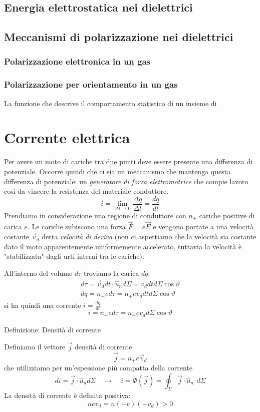 \documentclass[x11names]{report}
\newcommand{\definizione}[2]{
	\begin{center}
		\fboxsep11pt
		\colorbox{myblue}{\begin{minipage}{5.75in}
				\begin{blues}{Definizione: #1}
					#2
				\end{blues}
		\end{minipage}}
	\end{center}
}
\begin{document}
\subsection{Energia elettrostatica nei dielettrici}

\subsection{Meccanismi di polarizzazione nei dielettrici}
\subsubsection{Polarizzazione elettronica in un gas}
\subsubsection{Polarizzazione per orientamento in un gas}
La funzione che descrive il comportamento statistico di un insieme di 

\newpage


\section{Corrente elettrica}
Per avere un moto di cariche tra due punti deve essere presente una differenza di potenziale. Occorre quindi che ci sia un meccanismo che mantenga questa differenza di potenziale: un \textit{generatore di forza elettromotrice} che compie lavoro così da vincere la resistenza del materiale conduttore.
\[
i =  \lim_{\Delta t \to 0} \frac{\Delta q}{\Delta t} = \frac{dq}{dt}
\]
Prendiamo in considerazione una regione di conduttore con \(n_+\) cariche positive di carica \(e\). Le cariche subiscono una forza \(\vec{F} = e\vec{E}\) e vengono portate a una velocità costante \(\vec{v}_d\) detta \textit{velocità di deriva} (non ci aspettiamo che la velocità sia costante dato il moto apparentemente uniformemente accelerato, tuttavia la velocità è "stabilizzata" dagli urti interni tra le cariche).

All'interno del volume \(d\tau\) troviamo la carica \(dq\):
\begin{gather*}
	d\tau = \vec{v}_d dt \cdot \hat{u}_n d\Sigma = v_d dt d\Sigma \cos\vartheta \\
	dq = n_+ e d\tau = n_+ e v_d dt d\Sigma \cos\vartheta
\end{gather*}
si ha quindi una corrente \(i = \frac{dq}{dt}\) 
\[
i =  n_+ e d\tau = n_+ e v_d  d\Sigma \cos\vartheta
\]

\definizione{Densità di corrente}{
Definiamo il vettore \(\vec{j}\) densità di corrente 
\[
\vec{j} = n_+ e \vec{v}_d 
\]
che utilizziamo per un'espessione più compatta della corrente
\[
di = \vec{j}\cdot\hat{u}_n d\Sigma \quad \to \quad i = \Phi(\vec{j}) = \oint_\Sigma  \vec{j} \cdot \hat{u}_n \,\ d\Sigma
\]
La densità di corrente è definita positiva:
\[
n e v_d = n (-e)(-v_d) > 0
\]
}
\end{document}
